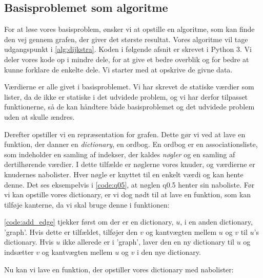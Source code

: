 \subsection{Basisproblemet som algoritme}
For at løse vores basisproblem, ønsker vi at opstille en algoritme, som kan finde den vej gennem grafen, der giver det største resultat. Vores algoritme vil tage udgangspunkt i \autoref{alg:dijkstra}. Koden i følgende afsnit er skrevet i Python 3. Vi deler vores kode op i mindre dele, for at give et bedre overblik og for bedre at kunne forklare de enkelte dele. Vi starter med at opskrive de givne data. 



Værdierne er alle givet i basisproblemet. Vi har skrevet de statiske værdier som lister, da de ikke er statiske i det udvidede problem, og vi har derfor tilpasset funktionerne, så de kan håndtere både basisproblemet og det udvidede problem uden at skulle ændres. 

Derefter opstiller vi en repræsentation for grafen. Dette gør vi ved at lave en funktion, der danner en \emph{dictionary}, en ordbog. En ordbog er en associationsliste, som indeholder en samling af indekser, der kaldes \emph{nøgler} og en samling af dertilhørende værdier. I dette tilfælde er nøglerne vores knuder, og
værdierne er knudernes nabolister. Hver nøgle er knyttet til en enkelt værdi og kan hente denne. Det ses eksempelvis i \autoref{code:q05}, at nøglen q0.5 henter sin naboliste.
Før vi kan opstille vores dictionary, er vi dog nødt til at lave en funktion, som kan tilføje kanterne, da vi skal bruge denne i funktionen:



\autoref{code:add_edge} tjekker først om der er en dictionary, $u$, i en anden dictionary, 'graph'. Hvis dette er tilfældet, tilføjer den $v$ og kantvægten mellem $u$ og $v$ til  $u$'s dictionary. Hvis $u$ ikke allerede er i 'graph', laver den en ny dictionary til $u$ og indsætter $v$ og kantvægten mellem $u$ og $v$ i den nye dictionary.

Nu kan vi lave en funktion, der opstiller vores dictionary med nabolister:



